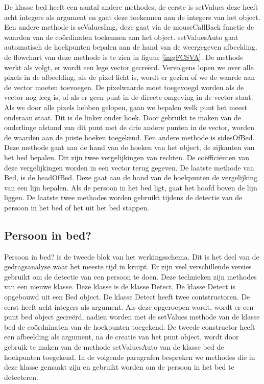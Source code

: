 De klasse bed heeft een aantal andere methodes, de eerste is setValues deze heeft acht integers als argument en gaat deze toekennen aan de integers van het object. Een andere methode is seValuesImg, deze gaat via de mouseCallBack functie de waarden van de co\"ordinaten toekennen aan het object. setValuesAuto gaat automatisch de hoekpunten bepalen aan de hand van de weergegeven afbeelding. de flowchart van deze methode is te zien in figuur \ref{imgFCSVA}. De methode werkt als volgt, er wordt een lege vector gecre\"erd. Vervolgens lopen we over alle pixels in de afbeelding, als de pixel licht is, wordt er gezien of we de waarde aan de vector moeten toevoegen. De pixelwaarde moet toegevoegd worden als de vector nog leeg is, of als er geen punt in de directe omgeving in de vector staat. Als we door alle pixels hebben gelopen, gaan we bepalen welk punt het meest onderaan staat. Dit is de linker onder hoek. Door gebruikt te maken van de onderlinge afstand van dit punt met de drie andere punten in de vector, worden de waarden aan de juiste hoeken toegekend. Een andere methode is sidesOfBed. Deze methode gaat aan de hand van de hoeken van het object, de zijkanten van het bed bepalen. Dit zijn twee vergelijkingen van rechten. De co\"effici\"enten van deze vergelijkingen worden in een vector terug gegeven. De laatste methode van Bed, is de headOfBed. Deze gaat aan de hand van de hoekpunten de vergelijking van een lijn bepalen. Als de persoon in het bed ligt, gaat het hoofd boven de lijn liggen. De laatste twee methodes worden gebruikt tijdens de detectie van de persoon in het bed of het uit het bed stappen.


\subsection{Persoon in bed?}
Persoon in bed? is de tweede blok van het werkingsschema. Dit is het deel van de gedragsanalyse waar het meeste tijd in kruipt. Er zijn veel verschillende versies gebruikt om de detectie van een persoon te doen. Deze technieken zijn methodes van een nieuwe klasse. Deze klasse is de klasse Detect. De klasse Detect is opgebouwd uit een Bed object. De klasse Detect heeft twee contstructoren. De eerst heeft acht integers als argument. Als deze opgeroepen wordt, wordt er een punt bed object gecre\"erd, nadien worden met de setValues methode van de klasse bed de co\"ordninaten van de hoekpunten toegekend. De tweede constructor heeft een afbeelding als argument, na de creatie van het punt object, wordt door gebruik te maken van de methode setValuesAuto van de klasse bed de hoekpunten toegekend. In de volgende paragrafen bespreken we methodes die in deze klasse gemaakt zijn en gebruikt worden om de persoon in het bed te detecteren.

